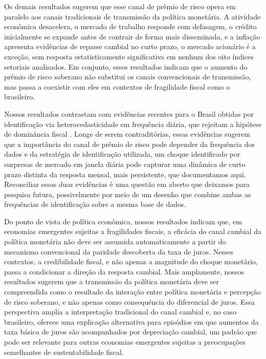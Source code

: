 \documentclass[preprint,authoryear,review,12pt]{elsarticle}
\begin{document}

Os demais resultados sugerem que esse canal de prêmio de risco opera em paralelo aos canais tradicionais de transmissão da política monetária. A atividade econômica desacelera, o mercado de trabalho responde com defasagem, o crédito inicialmente se expande antes de contrair de forma mais disseminada, e a inflação apresenta evidências de repasse cambial no curto prazo, o mercado acionário é a exceção, sem resposta estatisticamente significativa em nenhum dos oito índices setoriais analisados. Em conjunto, esses resultados indicam que o aumento do prêmio de risco soberano não substitui os canais convencionais de transmissão, mas passa a coexistir com eles em contextos de fragilidade fiscal como o brasileiro.

Nossos resultados contrastam com evidências recentes para o Brasil obtidas por identificação via heterocedasticidade em frequência diária, que rejeitam a hipótese de dominância fiscal \citep[]{goncalves2025}. Longe de serem contraditórias, essas evidências sugerem que a importância do canal de prêmio de risco pode depender da frequência dos dados e da estratégia de identificação utilizada, um choque identificado por surpresas de mercado em janela diária pode capturar uma dinâmica de curto prazo distinta da resposta mensal, mais persistente, que documentamos aqui. Reconciliar essas duas evidências é uma questão em aberto que deixamos para pesquisa futura, possivelmente por meio de um desenho que combine ambas as frequências de identificação sobre a mesma base de dados.

Do ponto de vista de política econômica, nossos resultados indicam que, em economias emergentes sujeitas a fragilidades fiscais, a eficácia do canal cambial da política monetária não deve ser assumida automaticamente a partir do mecanismo convencional da paridade descoberta da taxa de juros. Nesses contextos, a credibilidade fiscal, e não apenas a magnitude do choque monetário, passa a condicionar a direção da resposta cambial. Mais amplamente, nossos resultados sugerem que a transmissão da política monetária deve ser compreendida como o resultado da interação entre política monetária e percepção de risco soberano, e não apenas como consequência do diferencial de juros. Essa perspectiva amplia a interpretação tradicional do canal cambial e, no caso brasileiro, oferece uma explicação alternativa para episódios em que aumentos da taxa básica de juros são acompanhados por depreciação cambial, um padrão que pode ser relevante para outras economias emergentes sujeitas a preocupações semelhantes de sustentabilidade fiscal.
\end{document}
